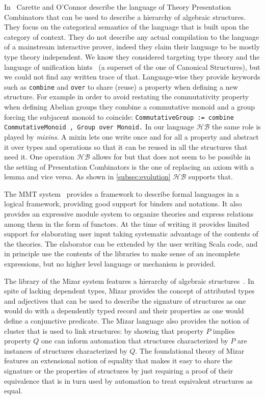 \documentclass[a4paper,UKenglish,cleveref, autoref]{lipics-v2019}
\newcommand{\HB}{\ensuremath{\mathcal{HB}}}
\newcommand{\mixin}{mixin}
\newcommand{\mixins}{mixins}
\theoremstyle{implem}
\theoremstyle{implem}
\theoremstyle{command}
\theoremstyle{commands}
\begin{document}
{{In~\cite{CaretteCombinators} Carette and O'Connor describe the language of
Theory Presentation Combinators that can be used to describe a hierarchy of
algebraic structures.
They focus on the categorical semantics of the language that is built upon
the category of context.
They do not describe any actual compilation to the language of a mainstream
interactive prover, indeed they claim their language to be mostly type theory
independent. We know they considered targeting type theory and the language
of unification hints~\cite{10.1007/978-3-642-03359-9_8}
(a superset of the one of Canonical Structures),
but we could not find any written trace of that. Language-wise they provide
keywords such as \verb+combine+ and \verb+over+ to share (reuse) a property
when defining a new structure. For example in order to avoid restating
the commutativity property when defining Abelian groups they combine
a commutative monoid and a group forcing the subjacent monoid to coincide: %
\verb-CommutativeGroup := combine CommutativeMonoid , Group over Monoid.-
In our language \HB{} the same role is played by \emph{\mixins{}}.
A \mixin{} lets one write once and for all a property and abstract it over types
and operations so that it can be reused in all the structures that need it.
One operation \HB{} allows for but that does not seem to be possible in the
setting of Presentation Combinators is the one of replacing an axiom with a
lemma and vice versa. As shown in \autoref{subsec:evolution} \HB{} supports
that.

The MMT system~\cite{RABE20131} provides a framework to describe formal
languages in a logical framework, providing good support for binders and
notations. It also provides an expressive module system to organize
theories and express relations among them in the form of functors.
At the time of writing
it provides limited support for elaborating user input taking systematic
advantage of the contents of the theories. The elaborator can be extended
by the user writing Scala code, and in principle use the contents of the
libraries to make sense of an incomplete expressions, but no higher level
language or mechanism is provided.

The library of the Mizar system features a hierarchy of algebraic
structures~\cite{7733265}. In spite of lacking dependent types, Mizar
provides the concept of attributed types and adjectives
that can be used to describe the signature of structures as one would
do with a dependently typed record and their properties as
one would define a conjunctive predicate.
The Mizar language also provides the notion of cluster that is used
to link structures: by showing that property $P$ implies property $Q$
one can inform automation that structures characterized by $P$ are
instances of structures characterized by $Q$. The foundational theory of Mizar
features an extensional notion of equality that makes it easy
to share the signature or the properties of structures by just requiring
a proof of their equivalence that is in turn used by automation to treat
equivalent structures as equal.

}}
\end{document}
